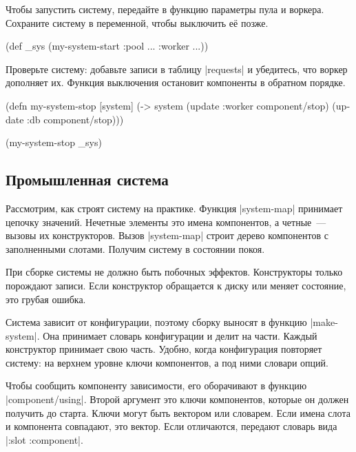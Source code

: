Чтобы запустить систему, передайте в функцию параметры пула и воркера. Сохраните
систему в переменной, чтобы выключить е\"{е} позже.

\begin{english}
  \begin{clojure}
(def _sys (my-system-start {:pool {...} :worker {...}}))
  \end{clojure}
\end{english}

Проверьте систему: добавьте записи в таблицу \spverb|requests| и убедитесь, что
воркер дополняет их. Функция выключения остановит компоненты в обратном порядке.

\begin{english}
  \begin{clojure}
(defn my-system-stop
  [system]
  (-> system
      (update :worker component/stop)
      (update :db component/stop)))

(my-system-stop _sys)
  \end{clojure}
\end{english}

\subsection{Промышленная система}

Рассмотрим, как строят систему на практике. Функция \spverb|system-map|
принимает цепочку значений. Нечетные элементы это имена компонентов, а
четные~--- вызовы их конструкторов. Вызов \spverb|system-map| строит дерево
компонентов с заполненными слотами. Получим систему в состоянии покоя.

При сборке системы не должно быть побочных эффектов. Конструкторы только
порождают записи. Если конструктор обращается к диску или меняет состояние, это
грубая ошибка.

Система зависит от конфигурации, поэтому сборку выносят в функцию
\spverb|make-system|. Она принимает словарь конфигурации и делит на
части. Каждый конструктор принимает свою часть. Удобно, когда конфигурация
повторяет систему: на верхнем уровне ключи компонентов, а под ними словари
опций.

Чтобы сообщить компоненту зависимости, его оборачивают в функцию
\spverb|component/using|. Второй аргумент это ключи компонентов, которые он
должен получить до старта. Ключи могут быть вектором или словарем. Если имена
слота и компонента совпадают, это вектор. Если отличаются, передают словарь вида
\spverb|{:slot :component}|.

